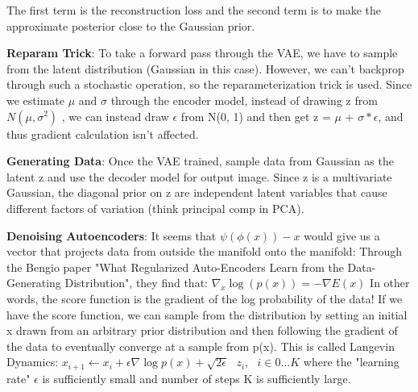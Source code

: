 The first term is the reconstruction loss and the second term is to make the approximate posterior close to the Gaussian prior. 


\textbf{Reparam Trick}: 
To take a forward pass through the VAE, we have to sample from the latent distribution (Gaussian in this case). However, we can't backprop through such a stochastic operation, so the reparameterization trick is used. Since we estimate $\mu$ and $\sigma$ through the encoder model, instead of drawing z from $N(\mu, \sigma^{2})$ , we can instead draw $\epsilon$ from N(0, 1) and then get z = $\mu$ + $\sigma * \epsilon$, and thus gradient calculation isn't affected. 

\textbf{Generating Data}: Once the VAE trained, sample data from Gaussian as the latent z and use the decoder model for output image. Since z is a multivariate Gaussian, the diagonal prior on z are independent latent variables that cause different factors of variation (think principal comp in PCA). 
    
\textbf{Denoising Autoencoders}:
It seems that $\psi(\phi(x)) - x$ would give us a vector that projects data from outside the manifold onto the manifold: 
Through the Bengio paper "What Regularized Auto-Encoders Learn from the Data-Generating Distribution", they find that: 
$\nabla_{x}\log(p(x)) = -\nabla E(x)$ In other words, the score function is the gradient of the log probability of the data! If we have the score function, we can sample from the distribution by setting an initial x drawn from an arbitrary prior distribution and then following the gradient of the data to eventually converge at a sample from p(x). This is called Langevin Dynamics: 
$x_{i+1} \leftarrow x_{i}+ \epsilon \nabla \log p(x) + \sqrt{2\epsilon} \text{ }z_{i}, \text{ } i \in 0 \dots K $ where the "learning rate" $\epsilon$ is sufficiently small and number of steps K is sufficiently large. 
